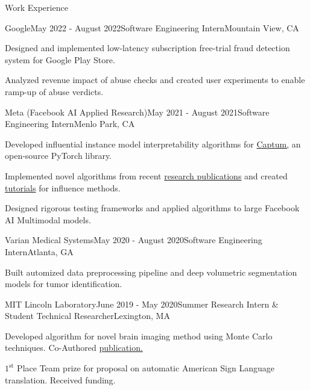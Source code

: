 \documentclass{template} %
\begin{document}
\begin{rSection}{Work Experience}

\begin{rSubsection}{Google}{May 2022 - August 2022}{Software Engineering Intern}{Mountain View, CA}
\item Designed and implemented low-latency subscription free-trial fraud detection system for Google Play Store.
\item Analyzed revenue impact of abuse checks and created user experiments to enable ramp-up of abuse verdicts.
\end{rSubsection}

\begin{rSubsection}{Meta (Facebook AI Applied Research)}{May 2021 - August 2021}{Software Engineering Intern}{Menlo Park, CA}
\item Developed influential instance model interpretability algorithms for \href{https://captum.ai/}{Captum,} an open-source PyTorch library.
\item Implemented novel algorithms from recent \href{https://arxiv.org/pdf/2002.08484.pdf}{research publications} and created \href{https://captum.ai/tutorials/TracInCP_Tutorial}{tutorials} for influence methods.
\item Designed rigorous testing frameworks and applied algorithms to large Facebook AI Multimodal models.
\end{rSubsection}

\begin{rSubsection}{Varian Medical Systems}{May 2020 - August 2020}{Software Engineering Intern}{Atlanta, GA}
\item Built automized data preprocessing pipeline and deep volumetric segmentation models for tumor identification. 
\end{rSubsection}

\begin{rSubsection}{MIT Lincoln Laboratory}{June 2019 - May 2020}{Summer Research Intern \& Student Technical Researcher}{Lexington, MA}
\item Developed algorithm for novel brain imaging method using Monte Carlo techniques. Co-Authored \href{https://bit.ly/AGpaper1}{publication.}
\item$1^{\text{st}}$ Place Team prize for proposal on automatic American Sign Language translation. Received funding.
\end{rSubsection}

\end{rSection}
\vspace{-2mm}
\end{document}
